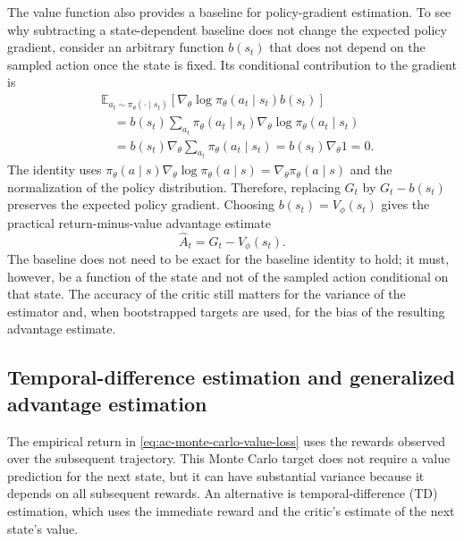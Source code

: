 The value function also provides a baseline for policy-gradient estimation.
To see why subtracting a state-dependent baseline does not change the
expected policy gradient, consider an arbitrary function \(b(s_t)\) that
does not depend on the sampled action once the state is fixed. Its
conditional contribution to the gradient is
\begin{align}
    &\mathbb{E}_{a_t\sim\pi_\theta(\cdot\mid s_t)}
    \left[
        \nabla_\theta\log\pi_\theta(a_t\mid s_t)b(s_t)
    \right]
    \nonumber\\
    &\quad=
    b(s_t)
    \sum_{a_t}
    \pi_\theta(a_t\mid s_t)
    \nabla_\theta\log\pi_\theta(a_t\mid s_t)
    \nonumber\\
    &\quad=
    b(s_t)
    \nabla_\theta
    \sum_{a_t}\pi_\theta(a_t\mid s_t)
    =
    b(s_t)\nabla_\theta 1
    =
    0.
    \label{eq:ac-baseline-identity}
\end{align}
The identity uses
\(\pi_\theta(a\mid s)\nabla_\theta\log\pi_\theta(a\mid s)
=\nabla_\theta\pi_\theta(a\mid s)\) and the normalization of the policy
distribution. Therefore, replacing \(G_t\) by \(G_t-b(s_t)\) preserves the
expected policy gradient. Choosing \(b(s_t)=V_\phi(s_t)\) gives the
practical return-minus-value advantage estimate
\begin{equation}
    \widehat{A}_t
    =
    G_t-V_\phi(s_t).
    \label{eq:ac-monte-carlo-advantage}
\end{equation}
The baseline does not need to be exact for the baseline identity to hold;
it must, however, be a function of the state and not of the sampled action
conditional on that state. The accuracy of the critic still matters for
the variance of the estimator and, when bootstrapped targets are used, for
the bias of the resulting advantage estimate.

\subsection{Temporal-difference estimation and generalized advantage estimation}
\label{subsec:ac-td-gae}

The empirical return in \cref{eq:ac-monte-carlo-value-loss} uses the
rewards observed over the subsequent trajectory. This Monte Carlo target
does not require a value prediction for the next state, but it can have
substantial variance because it depends on all subsequent rewards. An
alternative is temporal-difference (TD) estimation, which uses the
immediate reward and the critic's estimate of the next state's value.

